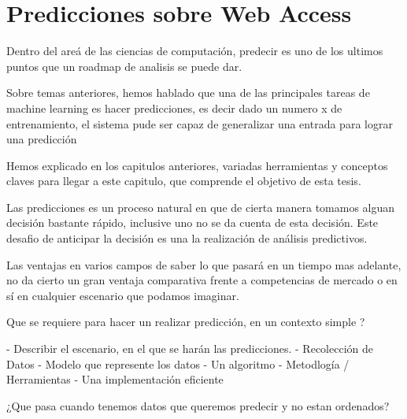 \chapter[Predicciones sobre Web Access]{Predicciones sobre Web Access} 
\label{ch:predicciones}



Dentro del areá de las ciencias de computación, predecir es uno de los ultimos puntos que un roadmap de analisis se puede dar.


Sobre temas anteriores, hemos hablado que una de las principales tareas de machine learning es hacer predicciones, es decir dado un numero x de entrenamiento, el sistema pude ser capaz de generalizar una entrada para lograr una predicción



 
Hemos explicado en los capitulos anteriores, variadas herramientas y conceptos claves para llegar a este capitulo, que comprende el objetivo de esta tesis.


Las predicciones es un proceso natural en que de cierta manera tomamos alguan decisión bastante rápido, inclusive uno no se da cuenta de esta decisión. Este desafio de anticipar la decisión es una la realización de análisis predictivos.


Las ventajas en varios campos de saber lo que pasará en un tiempo mas adelante, no da cierto un gran ventaja comparativa frente a competencias de mercado o en sí en cualquier escenario que podamos imaginar.


Que se requiere para hacer un realizar predicción, en un contexto simple ?

- Describir el escenario, en el que se harán las predicciones.
- Recolección de Datos
- Modelo que represente los datos
- Un algoritmo
- Metodlogía / Herramientas
- Una implementación eficiente


¿Que pasa cuando tenemos datos que queremos predecir y no estan ordenados?

